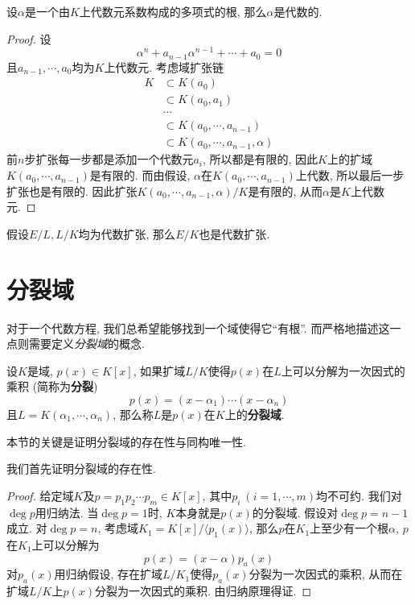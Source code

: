 \begin{thm}\label{algcoef}
    设$\alpha$是一个由$K$上代数元系数构成的多项式的根, 那么$\alpha$是代数的.
\end{thm}
\begin{proof}
    设
    \[\alpha^n+a_{n-1}\alpha^{n-1}+\cdots+a_0=0\]
    且$a_{n-1},\cdots,a_0$均为$K$上代数元.
    考虑域扩张链
    \begin{align*}
        K&\subset K(a_0)\\
        &\subset K(a_0,a_1)\\
        &\cdots\\
        &\subset K(a_0,\cdots,a_{n-1})\\
        &\subset K(a_0,\cdots,a_{n-1},\alpha)
    \end{align*}
    前$n$步扩张每一步都是添加一个代数元$a_i$, 所以都是有限的, 因此$K$上的扩域$K(a_0,\cdots,a_{n-1})$是有限的.
    而由假设, $\alpha$在$K(a_0,\cdots,a_{n-1})$上代数, 所以最后一步扩张也是有限的.
    因此扩张$K(a_0,\cdots,a_{n-1},\alpha)/K$是有限的, 从而$\alpha$是$K$上代数元.
\end{proof}

\begin{col}\label{alg of alg}
    假设$E/L,L/K$均为代数扩张, 那么$E/K$也是代数扩张.
\end{col}

\section{分裂域}

对于一个代数方程, 我们总希望能够找到一个域使得它``有根''.
而严格地描述这一点则需要定义\textit{分裂域}的概念.

\begin{defn}
    设$K$是域, $p(x)\in K[x]$, 如果扩域$L/K$使得$p(x)$在$L$上可以分解为一次因式的乘积 (简称为\textbf{分裂})
    \[p(x)=(x-\alpha_1)\cdots(x-\alpha_n)\]
    且$L=K(\alpha_1,\cdots,\alpha_n)$, 那么称$L$是$p(x)$在$K$上的\textbf{分裂域}.
\end{defn}

本节的关键是证明分裂域的存在性与同构唯一性.

我们首先证明分裂域的存在性.
\begin{proof}
    给定域$K$及$p=p_1p_2\cdots p_m\in K[x]$, 其中$p_i\ (i=1,\cdots,m)$均不可约.
    我们对$\deg{p}$用归纳法.
    当$\deg{p}=1$时, $K$本身就是$p(x)$的分裂域.
    假设对$\deg{p}=n-1$成立.
    对$\deg{p}=n$, 考虑域$K_1=K[x]/\langle p_1(x)\rangle$, 那么$p$在$K_1$上至少有一个根$\alpha$, $p$在$K_1$上可以分解为
    \[p(x)=(x-\alpha)p_a(x)\]
    对$p_a(x)$用归纳假设, 存在扩域$L/K_1$使得$p_a(x)$分裂为一次因式的乘积, 从而在扩域$L/K$上$p(x)$分裂为一次因式的乘积.
    由归纳原理得证.
\end{proof}

